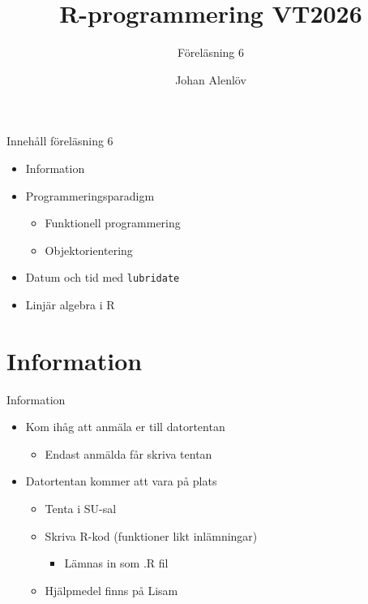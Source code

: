 \documentclass[
  11pt,
  ignorenonframetext,
  handout]{beamer}
\title{\texorpdfstring{R-programmering VT2026}{R-programmering VT2026}}
\subtitle{\texorpdfstring{Föreläsning 6}{Föreläsning 6}}
\author{\texorpdfstring{Johan Alenlöv}{Johan Alenlöv}}
\date{}
\institute{Linköpings Universitet}
\providecommand{\tightlist}{%
  \setlength{\itemsep}{0pt}\setlength{\parskip}{0pt}}
\begin{document}
\frame{\titlepage}

\begin{frame}{Innehåll föreläsning 6}
\protect{}\label{innehuxe5ll-fuxf6reluxe4sning-6}
\begin{itemize}
\tightlist
\item
  Information
\item
  Programmeringsparadigm

  \begin{itemize}
  \tightlist
  \item
    Funktionell programmering
  \item
    Objektorientering
  \end{itemize}
\item
  Datum och tid med \texttt{lubridate}
\item
  Linjär algebra i R
\end{itemize}
\end{frame}

\section{Information}\label{information}

\begin{frame}{Information}
\protect{}\label{information-1}
\begin{itemize}
\tightlist
\item
  Kom ihåg att anmäla er till datortentan

  \begin{itemize}
  \tightlist
  \item
    Endast anmälda får skriva tentan
  \end{itemize}
\item
  Datortentan kommer att vara på plats

  \begin{itemize}
  \tightlist
  \item
    Tenta i SU-sal
  \item
    Skriva R-kod (funktioner likt inlämningar)

    \begin{itemize}
    \tightlist
    \item
      Lämnas in som .R fil
    \end{itemize}
  \item
    Hjälpmedel finns på Lisam
  \end{itemize}
\end{itemize}
\end{frame}
\end{document}
